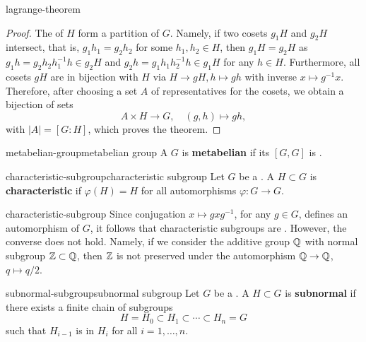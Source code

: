 \begin{example}{lagrange-theorem}
    \begin{proof}
        The  of $H$ form a partition of $G$. Namely, if two cosets $g_1 H$ and $g_2 H$ intersect, that is, $g_1 h_1 = g_2 h_2$ for some $h_1, h_2 \in H$, then $g_1 H = g_2 H$ as $g_1 h = g_2 h_2 h_1^{-1} h \in g_2 H$ and $g_2 h = g_1 h_1 h_2^{-1} h \in g_1 H$ for any $h \in H$. Furthermore, all cosets $gH$ are in bijection with $H$ via $H \to gH, h \mapsto g h$ with inverse $x \mapsto g^{-1} x$. Therefore, after choosing a set $A$ of representatives for the cosets, we obtain a bijection of sets
        \[ A \times H \to G, \quad (g, h) \mapsto gh , \]
        with $|A| = [G : H]$, which proves the theorem.
    \end{proof}
\end{example}

\begin{topic}{metabelian-group}{metabelian group}
    A  $G$ is \textbf{metabelian} if its  $[G, G]$ is .
\end{topic}

\begin{topic}{characteristic-subgroup}{characteristic subgroup}
    Let $G$ be a . A  $H \subset G$ is \textbf{characteristic} if $\varphi(H) = H$ for all automorphisms $\varphi : G \to G$.
\end{topic}

\begin{example}{characteristic-subgroup}
    Since conjugation $x \mapsto gxg^{-1}$, for any $g \in G$, defines an automorphism of $G$, it follows that characteristic subgroups are . However, the converse does not hold. Namely, if we consider the additive group $\mathbb{Q}$ with normal subgroup $\mathbb{Z} \subset \mathbb{Q}$, then $\mathbb{Z}$ is not preserved under the automorphism $\mathbb{Q} \to \mathbb{Q}$, $q \mapsto q/2$.
\end{example}

\begin{topic}{subnormal-subgroup}{subnormal subgroup}
    Let $G$ be a . A  $H \subset G$ is \textbf{subnormal} if there exists a finite chain of subgroups
    \[ H = H_0 \subset H_1 \subset \cdots \subset H_n = G \]
    such that $H_{i - 1}$ is  in $H_i$ for all $i = 1, \ldots, n$.
\end{topic}

